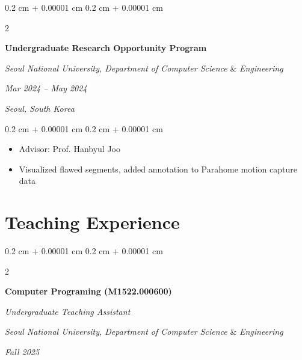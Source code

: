 \documentclass[10pt, letterpaper]{article}
\newenvironment{highlights}{
    \begin{itemize}[
        topsep=0.10 cm,
        parsep=0.10 cm,
        partopsep=0pt,
        itemsep=0pt,
        leftmargin=0.4 cm + 10pt
    ]
}{
    \end{itemize}
} %
\newenvironment{onecolentry}{
    \begin{adjustwidth}{
        0.2 cm + 0.00001 cm
    }{
        0.2 cm + 0.00001 cm
    }
}{
    \end{adjustwidth}
} %
\newenvironment{twocolentry}[2][]{
    \onecolentry
    \def\secondColumn{#2}
    \setcolumnwidth{\fill, 4.5 cm}
    \begin{paracol}{2}
}{
    \switchcolumn \raggedleft \secondColumn
    \end{paracol}
    \endonecolentry
} %
\begin{document}
        \vspace{0.3 cm}

        \begin{twocolentry}{
        \textit{Mar 2024 – May 2024}
        
        \textit{Seoul, South Korea}}
            \textbf{Undergraduate Research Opportunity Program}
            
            \textit{Seoul National University,  Department of Computer Science} \& \textit{Engineering}
        \end{twocolentry}

        \vspace{0.10 cm}
        \begin{onecolentry}
            \begin{highlights}
                \item Advisor: Prof. Hanbyul Joo
                \item Visualized flawed segments, added annotation to Parahome motion capture data
            \end{highlights}
        \end{onecolentry}
         

    \section{Teaching Experience}

        \begin{twocolentry}{
        \textit{Fall 2025}}
            \textbf{Computer Programing (M1522.000600)}
            
            \textit{Undergraduate Teaching Assistant}
    
            \textit{Seoul National University,  Department of Computer Science} \& \textit{Engineering}
        \end{twocolentry}

        \vspace{0.10 cm}
    
\end{document}
